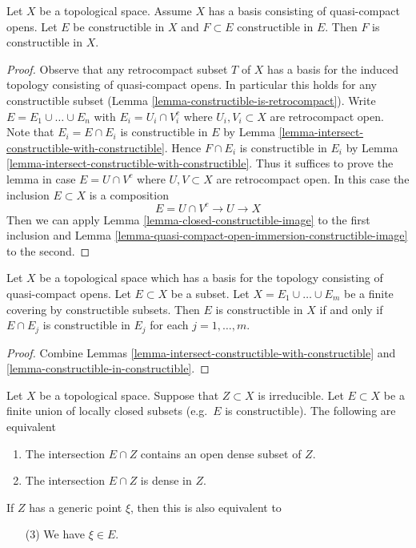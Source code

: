 \begin{lemma}
\label{lemma-constructible-in-constructible}
Let $X$ be a topological space. Assume
$X$ has a basis consisting of quasi-compact opens.
Let $E$ be constructible in $X$ and $F \subset E$ constructible in $E$.
Then $F$ is constructible in $X$.
\end{lemma}

\begin{proof}
Observe that any retrocompact subset $T$ of $X$ has a basis for the induced
topology consisting of quasi-compact opens. In particular this holds
for any constructible subset
(Lemma \ref{lemma-constructible-is-retrocompact}).
Write $E = E_1 \cup \ldots \cup E_n$ with $E_i = U_i \cap V_i^c$
where $U_i, V_i \subset X$ are retrocompact open.
Note that $E_i = E \cap E_i$ is constructible in $E$ by
Lemma \ref{lemma-intersect-constructible-with-constructible}.
Hence $F \cap E_i$ is constructible in $E_i$ by
Lemma \ref{lemma-intersect-constructible-with-constructible}.
Thus it suffices to prove the lemma in case $E = U \cap V^c$
where $U, V \subset X$ are retrocompact open.
In this case the inclusion $E \subset X$ is a composition
$$
E = U \cap V^c \to U \to X
$$
Then we can apply Lemma \ref{lemma-closed-constructible-image}
to the first inclusion and
Lemma \ref{lemma-quasi-compact-open-immersion-constructible-image}
to the second.
\end{proof}

\begin{lemma}
\label{lemma-collate-constructible-from-constructible}
Let $X$ be a topological space which has a basis for the topology
consisting of quasi-compact opens. Let $E \subset X$ be a subset.
Let $X = E_1 \cup \ldots \cup E_m$ be a finite covering by constructible
subsets. Then $E$ is constructible in $X$ if and only if $E \cap E_j$
is constructible in $E_j$ for each $j = 1, \ldots, m$.
\end{lemma}

\begin{proof}
Combine
Lemmas \ref{lemma-intersect-constructible-with-constructible} and
\ref{lemma-constructible-in-constructible}.
\end{proof}

\begin{lemma}
\label{lemma-generic-point-in-constructible}
Let $X$ be a topological space. Suppose that
$Z \subset X$ is irreducible. Let $E \subset X$
be a finite union of locally closed subsets (e.g.\ $E$
is constructible). The following are equivalent
\begin{enumerate}
\item The intersection $E \cap Z$ contains an open
dense subset of $Z$.
\item The intersection $E \cap Z$ is dense in $Z$.
\end{enumerate}
If $Z$ has a generic point $\xi$, then this is
also equivalent to
\begin{enumerate}
\item[(3)] We have $\xi \in E$.
\end{enumerate}
\end{lemma}


